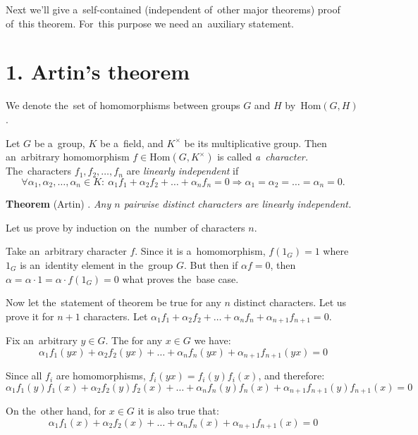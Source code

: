 \documentclass[twoside]{article}
\begin{document}
Next we'll give a~self-contained (independent of~other major theorems) proof of~this theorem.
For~this purpose we need an~auxiliary statement.

\section*{1. Artin's theorem}
We denote the~set of homomorphisms between groups $G$ and $H$ by~$\mathrm{Hom}(G, H)$.

Let $G$ be a~group, $K$ be a~field, and $K^{\times}$ be its multiplicative group. Then an~arbitrary
homomorphism $f \in \mathrm{Hom}(G, K^{\times})$ is called \textit{a~character.} The~characters $f_1, f_2, \ldots, f_n$
are \textit{linearly independent} if
$$
    \forall \alpha_1, \alpha_2, \ldots, \alpha_n \in K{:}\ \alpha_1 f_1 + \alpha_2 f_2 + \ldots + \alpha_n f_n = 0 \Rightarrow \alpha_1 = \alpha_2 = \ldots = \alpha_n = 0.
$$

\noindent\textbf{Theorem} (Artin) \cite{Art48}.\emph{
    Any $n$ pairwise distinct characters are linearly independent.
}\medskip

    Let us prove by induction on~the~number of characters $n$.

    Take an~arbitrary character $f$. Since it is a~homomorphism, $f(1_G) = 1$
    where $1_G$ is an~identity element in the~group $G$. But then if $\alpha f = 0$, then
    $\alpha = \alpha \cdot 1 = \alpha \cdot f(1_G) = 0$ what proves the~base case.

    Now let the~statement of theorem be true for any $n$ distinct characters. Let us prove
    it for $n + 1$ characters. Let $\alpha_1 f_1 + \alpha_2 f_2 + \ldots + \alpha_n f_n + \alpha_{n + 1} f_{n + 1} = 0$.

    Fix an~arbitrary $y \in G$. The for any $x \in G$ we have:
    \begin{equation}\label{Artin:first}
        \alpha_1 f_1(yx) + \alpha_2 f_2(yx) + \ldots + \alpha_n f_n(yx) + \alpha_{n + 1} f_{n + 1}(yx) = 0
    \end{equation}

    Since all $f_i$ are homomorphisms, $f_i(yx) = f_i(y) f_i(x)$, and therefore:
    $$
        \alpha_1 f_1(y) f_1(x) + \alpha_2 f_2(y) f_2(x) + \ldots + \alpha_n f_n(y) f_n(x) + \alpha_{n + 1} f_{n + 1}(y) f_{n + 1}(x) = 0
    $$

    On the~other hand, for $x \in G$ it is also true that:
    $$
        \alpha_1 f_1(x) + \alpha_2 f_2(x) + \ldots + \alpha_n f_n(x) + \alpha_{n + 1} f_{n + 1}(x) = 0
    $$
\end{document}
